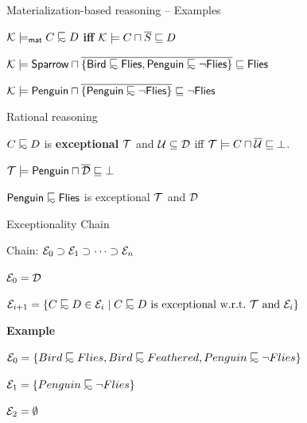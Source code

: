 \documentclass[10pt]{beamer}
\begin{document}
\begin{frame}[fragile]{Materialization-based reasoning -- Examples}
\large{
  $\Kmc \models_{\mathsf{mat}} C \definc D$ \textbf{iff} $\mathcal{K} \models C \sqcap \overline{S} \sqsubseteq D$ 

  \vspace{5mm}

  $\Kmc \models \dlFont{Sparrow} \sqcap \materialization{\{\dlFont{Bird} \definc \dlFont{Flies}, \dlFont{Penguin} \definc \lnot \dlFont{Flies}\}} \sqsubseteq \dlFont{Flies}$ 

  \vspace{2mm}

  $\Kmc \models \dlFont{Penguin} \sqcap \overline{\{\dlFont{Penguin} \definc \lnot \dlFont{Flies}\}} \sqsubseteq \lnot \dlFont{Flies}$ 
}
\end{frame}

%
%

\begin{frame}[fragile]{Rational reasoning}
  \begin{center}
    \large {$C \definc D$ is \textbf{exceptional} \wrt $\mathcal{T}$ and $\mathcal{U} \subseteq \mathcal{D}$ iff $\mathcal{T} \models C \sqcap \overline{\mathcal{U}} \sqsubseteq \bot$.
    }
\end{center}

\pause
\vspace{0.5cm}
\large{ \color{teal}
  $\mathcal{T} \models \mathsf{Penguin} \sqcap \overline{\mathcal{D}} \sqsubseteq \bot$

  \vspace{0.3cm}
  $\dlFont{Penguin} \definc \dlFont{Flies}$ is exceptional \wrt $\mathcal{T}$ and $\mathcal{D}$
}
\end{frame}

%
%
\begin{frame}[fragile]{Exceptionality Chain}

    \large{
    Chain: $\mathcal{E}_0 \supset \mathcal{E}_1 \supset \dots \supset \mathcal{E}_n$
    
  \vspace{0.3cm}

    $\mathcal{E}_0 = \mathcal{D}$

    $\Emc_{i + 1} = \{C \definc D \in \Emc_{i} \mid C \definc D \text{ is exceptional \wrt } \Tmc \text{ and } \Emc_i\}$
    }

    \vspace{0.5cm}
    \pause
\begin{center}
  \textbf{Example}
\end{center}

    $\Emc_0 = \{Bird \definc Flies, Bird \definc Feathered, Penguin \definc \lnot Flies\}$
    
    $\Emc_1 = \{Penguin \definc \lnot Flies\}$
    
    $\mathcal{E}_2 = \emptyset$
\end{frame}
\end{document}
